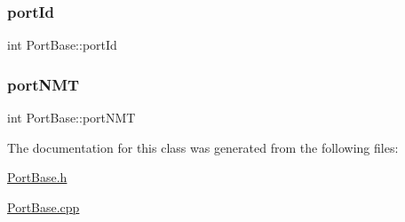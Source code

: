 \subsubsection{\texorpdfstring{port\+Id}{portId}}
{\footnotesize\ttfamily int Port\+Base\+::port\+Id\hspace{0.3cm}{\ttfamily [protected]}}

\mbox{\label{classPortBase_ae63f6df54bbeac1046b5dfbe178e1cee}} 
\subsubsection{\texorpdfstring{port\+N\+MT}{portNMT}}
{\footnotesize\ttfamily int Port\+Base\+::port\+N\+MT\hspace{0.3cm}{\ttfamily [protected]}}



The documentation for this class was generated from the following files\+:\begin{DoxyCompactItemize}
\item 
\hyperlink{PortBase_8h}{Port\+Base.\+h}\item 
\hyperlink{PortBase_8cpp}{Port\+Base.\+cpp}\end{DoxyCompactItemize}
